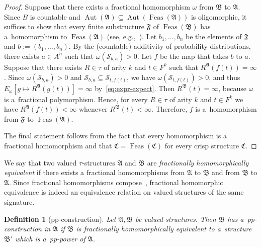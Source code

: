 \documentclass[preprint,12pt]{elsarticle}
\newcommand{\bA}{{\mathfrak A}}
\newcommand{\bB}{{\mathfrak B}}
\newcommand{\bC}{{\mathfrak C}}
\newcommand{\bF}{{\mathfrak F}}
\DeclareMathOperator{\Aut}{Aut}
\DeclareMathOperator{\Feas}{Feas}
\newtheorem{definition}[theorem]{Definition}
\begin{document}
\begin{proof}
Suppose that there exists a fractional homomorphism $\omega$ from $\bB$ to $\bA$. 
Since $B$ is countable and $\Aut(\bA) \subseteq \Aut(\Feas(\bA))$ is oligomorphic, it suffices to show that every finite substructure $\bF$ of $\Feas(\bB)$ has a~homomorphism to $\Feas(\bA)$ (see, e.g.,~\cite[Lemma 4.1.7]{Book}). 
Let $b_1,\dots,b_n$ be the elements of $\bF$ and $b:=(b_1, \dots, b_n)$. 
By the (countable) additivity of probability distributions, there
exists $a \in A^n$ such that $\omega(\mathscr{S}_{b,a})>0$.
Let $f$ be the map that takes $b$ to $a$. 
Suppose that there exists $R \in \tau$ of arity $k$ and $t \in F^k$ such that  
$R^{\bA}(f(t)) = \infty$. 
Since $\omega(\mathscr{S}_{b,a})>0$ and $\mathscr{S}_{b,a} \subseteq {\mathscr{S}}_{t,f(t)}$, we have  $\omega({\mathscr{S}}_{t,f(t)})>0$, and thus $E_\omega[g \mapsto R^{\bA}(g(t))] = \infty$ by~\eqref{eq:expr-expect}. 
Then $R^{\bB}(t) = \infty$, because $\omega$ is a~fractional polymorphism.
Hence, for every $R \in \tau$ of arity $k$ and $t \in F^k$ we have 
$R^{\bA}(f(t)) < \infty$ 
whenever 
$R^{\bB}(t) < \infty$. Therefore,  $f$ is a~homomorphism from $\bF$ to $\Feas(\bA)$.

The final statement follows from the fact that every homomorphism is a fractional homomorphism and that $\bC = \Feas(\bC)$ for every crisp structure $\bC$. 
\end{proof}


We say that two valued $\tau$-structures  $\bA$ and $\bB$ are \emph{fractionally homomorphically equivalent} if there exists a fractional homomorphisms from $\bA$ to $\bB$ and from $\bB$ to $\bA$. Since fractional homomorphisms compose~\cite{Resilience-VCSPs}, fractional homomorphic equivalence is indeed an equivalence relation on valued structures of the same signature. 

\begin{definition}[pp-construction]
\label{def:pp-constr}
Let $\bA, \bB$ be valued structures. Then  $\bB$ has a~\emph{pp-construction} in $\bA$ if $\bB$ 
is fractionally homomorphically equivalent to a~structure $\bB'$ which is a~pp-power of $\bA$. 
\end{definition}
\end{document}
